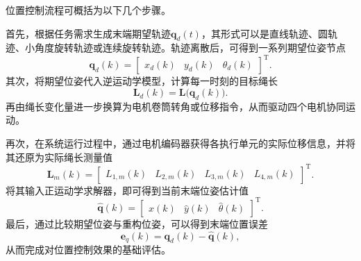 位置控制流程可概括为以下几个步骤。

首先，根据任务需求生成末端期望轨迹$\bm q_d(t)$，其形式可以是直线轨迹、圆轨迹、小角度旋转轨迹或连续旋转轨迹。轨迹离散后，可得到一系列期望位姿节点
\begin{equation}
  \bm q_d(k)= \begin{bmatrix} x_d(k) & y_d(k) & \theta_d(k) \end{bmatrix}^{\mathrm T}.
\end{equation}
其次，将期望位姿代入逆运动学模型，计算每一时刻的目标绳长
\begin{equation}
  \bm L_d(k)=\bm L\bigl(\bm q_d(k)\bigr).
\end{equation}
再由绳长变化量进一步换算为电机卷筒转角或位移指令，从而驱动四个电机协同运动。

再次，在系统运行过程中，通过电机编码器获得各执行单元的实际位移信息，并将其还原为实际绳长测量值
\begin{equation}
  \bm L_m(k)= \begin{bmatrix} L_{1,m}(k) & L_{2,m}(k) & L_{3,m}(k) & L_{4,m}(k) \end{bmatrix}^{\mathrm T}.
\end{equation}
将其输入正运动学求解器，即可得到当前末端位姿估计值
\begin{equation}
  \hat{\bm q}(k)= \begin{bmatrix} \hat{x}(k) & \hat{y}(k) & \hat{\theta}(k) \end{bmatrix}^{\mathrm T}.
\end{equation}
最后，通过比较期望位姿与重构位姿，可以得到末端位置误差
\begin{equation}
  \bm e_q(k)=\bm q_d(k)-\hat{\bm q}(k),
\end{equation}
从而完成对位置控制效果的基础评估。

